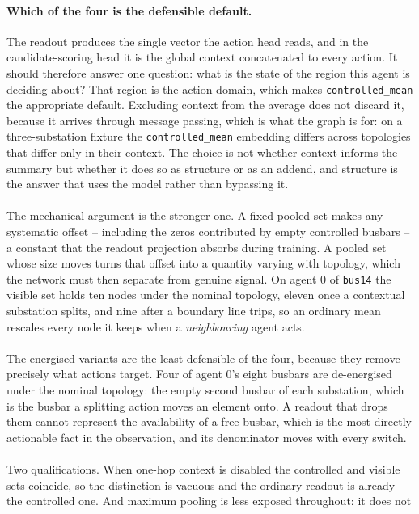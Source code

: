 {\color{clarif}
\paragraph{Which of the four is the defensible default.}
The readout produces the single vector the action head reads, and in the
candidate-scoring head it is the global context concatenated to every action.
It should therefore answer one question: what is the state of the region this
agent is deciding about? That region is the action domain, which makes
\texttt{controlled\_mean} the appropriate default. Excluding context from the
average does not discard it, because it arrives through message passing, which
is what the graph is for: on a three-substation fixture the
\texttt{controlled\_mean} embedding differs across topologies that differ only
in their context. The choice is not whether context informs the summary but
whether it does so as structure or as an addend, and structure is the answer
that uses the model rather than bypassing it.
\\
\\
The mechanical argument is the stronger one. A fixed pooled set makes any
systematic offset -- including the zeros contributed by empty controlled
busbars -- a constant that the readout projection absorbs during training. A
pooled set whose size moves turns that offset into a quantity varying with
topology, which the network must then separate from genuine signal. On agent
$0$ of \texttt{bus14} the visible set holds ten nodes under the nominal
topology, eleven once a contextual substation splits, and nine after a boundary
line trips, so an ordinary mean rescales every node it keeps when a
\emph{neighbouring} agent acts.
\\
\\
The energised variants are the least defensible of the four, because they
remove precisely what actions target. Four of agent $0$'s eight busbars are
de-energised under the nominal topology: the empty second busbar of each
substation, which is the busbar a splitting action moves an element onto. A
readout that drops them cannot represent the availability of a free busbar,
which is the most directly actionable fact in the observation, and its
denominator moves with every switch.
\\
\\
Two qualifications. When one-hop context is disabled the controlled and visible
sets coincide, so the distinction is vacuous and the ordinary readout is already
the controlled one. And maximum pooling is less exposed throughout: it does not
}

